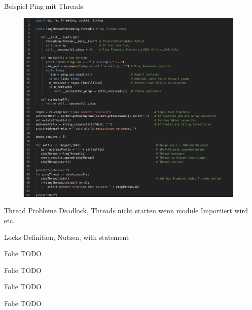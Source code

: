\begin{frame}{Beispiel Ping mit Threads}
    \begin{figure}[!htb]
        \includegraphics[scale=0.23]{6-python3/img/pingthreads}
    \end{figure}

\end{frame}

\begin{frame}{Thread Probleme}
    Deadlock, Threads nicht starten wenn module Importiert wird etc.
\end{frame}

\begin{frame}{Locks}
   Definition, Nutzen, with statement
\end{frame}


\begin{frame}{Folie}
    TODO
\end{frame}

\begin{frame}{Folie}
    TODO
\end{frame}

\begin{frame}{Folie}
    TODO
\end{frame}

\begin{frame}{Folie}
    TODO
\end{frame}

